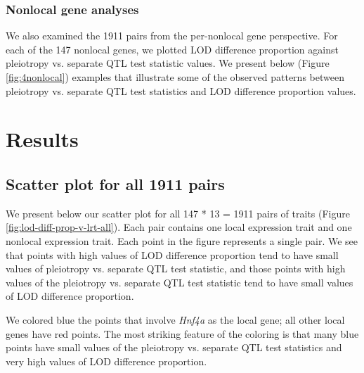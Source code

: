 \documentclass{article}
\begin{document}
\subsubsection{Nonlocal gene analyses}

We also examined the 1911 pairs from the per-nonlocal gene perspective. For each of the 147 nonlocal genes, we plotted LOD difference proportion against pleiotropy vs. separate QTL test statistic values. We present below (Figure \ref{fig:4nonlocal}) examples that illustrate some of the observed patterns between pleiotropy vs. separate QTL test statistics and LOD difference proportion values.


\section{Results}

\subsection{Scatter plot for all 1911 pairs}

We present below our scatter plot for all 147 * 13 = 1911 pairs of traits (Figure \ref{fig:lod-diff-prop-v-lrt-all}). Each pair contains one local expression trait and one nonlocal expression trait. Each point in the figure represents a single pair. We see that points with high values of LOD difference proportion tend to have small values of pleiotropy vs. separate QTL test statistic, and those points with high values of the pleiotropy vs. separate QTL test statistic tend to have small values of LOD difference proportion. 

We colored blue the points that involve \emph{Hnf4a} as the local gene; all other local genes have red points. The most striking feature of the coloring is that many blue points have small values of the pleiotropy vs. separate QTL test statistics and very high values of LOD difference proportion. 
\end{document}

